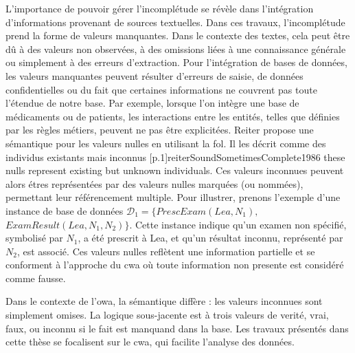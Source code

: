 L'importance de pouvoir gérer l'incomplétude se révèle dans l'intégration d'informations provenant de sources textuelles.
Dans ces travaux, l'incomplétude prend la forme de valeurs manquantes.
Dans le contexte des textes, cela peut être dû à des valeurs non observées, à des omissions liées à une connaissance générale ou simplement à des erreurs d'extraction.
Pour l'intégration de bases de données, les valeurs manquantes peuvent résulter d'erreurs de saisie, de données confidentielles ou du fait que certaines informations ne couvrent pas toute l'étendue de notre base.
Par exemple, lorsque l'on intègre une base de médicaments ou de patients, les interactions entre les entités, telles que définies par les règles métiers, peuvent ne pas être explicitées.
Reiter propose une sémantique pour les valeurs nulles en utilisant la \gls{fol}.
Il les décrit comme des individus existants mais inconnus [p.1]{reiterSoundSometimesComplete1986}{\label{reiterSemantic}\textelp{} these nulls represent existing but unknown individuals}.
Ces valeurs inconnues peuvent alors étres représentées par des valeurs nulles marquées (ou nommées), permettant leur référencement multiple.
Pour illustrer, prenons l'exemple d'une instance de base de données $\mathcal{D}_1= \{PrescExam(Lea, N_1),$ $ExamResult(Lea, N_1, N_2)\}$.
Cette instance indique qu'un examen non spécifié, symbolisé par $N_1$, a été prescrit à Lea, et qu'un résultat inconnu, représenté par $N_2$, est associé.
Ces valeurs nulles reflètent une information partielle et se conforment à l'approche du \gls{cwa} où toute information non presente est considéré comme fausse.

Dans le contexte de l'\gls{owa}, la sémantique diffère : les valeurs inconnues sont simplement omises.%
La logique sous-jacente est à trois valeurs de verité, vrai, faux, ou inconnu si le fait est manquand dans la base.
Les travaux présentés dans cette thèse se focalisent sur le \gls{cwa}, qui facilite l'analyse des données. %

